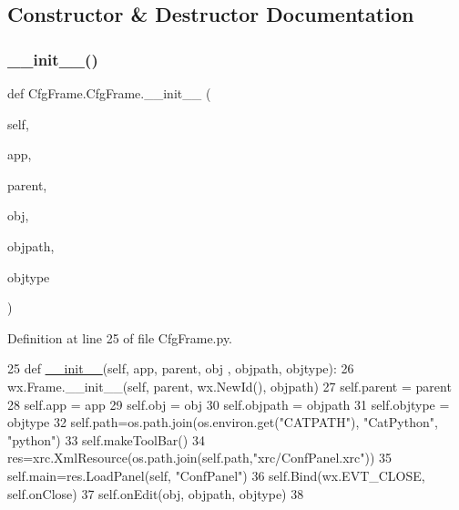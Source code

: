\subsection{Constructor \& Destructor Documentation}
\mbox{\label{classCfgFrame_1_1CfgFrame_aa0881a28d515572385ac1561e63c5c66}} 
\subsubsection{\texorpdfstring{\+\_\+\+\_\+init\+\_\+\+\_\+()}{\_\_init\_\_()}}
{\footnotesize\ttfamily def Cfg\+Frame.\+Cfg\+Frame.\+\_\+\+\_\+init\+\_\+\+\_\+ (\begin{DoxyParamCaption}\item[{}]{self,  }\item[{}]{app,  }\item[{}]{parent,  }\item[{}]{obj,  }\item[{}]{objpath,  }\item[{}]{objtype }\end{DoxyParamCaption})}



Definition at line 25 of file Cfg\+Frame.\+py.


\begin{DoxyCode}
25     \textcolor{keyword}{def }\hyperlink{classwrapper_1_1ModuleDictWrapper_a9a7a794150502f51df687831583e13b9}{\_\_init\_\_}(self, app, parent, obj , objpath, objtype): 
26         wx.Frame.\_\_init\_\_(self, parent, wx.NewId(), objpath)
27         self.parent  = parent
28         self.app     = app
29         self.obj     = obj
30         self.objpath = objpath
31         self.objtype = objtype
32         self.path=os.path.join(os.environ.get(\textcolor{stringliteral}{"CATPATH"}), \textcolor{stringliteral}{"CatPython"}, \textcolor{stringliteral}{"python"})
33         self.makeToolBar()
34         res=xrc.XmlResource(os.path.join(self.path,\textcolor{stringliteral}{"xrc/ConfPanel.xrc"}))
35         self.main=res.LoadPanel(self, \textcolor{stringliteral}{"ConfPanel"})                
36         self.Bind(wx.EVT\_CLOSE, self.onClose)
37         self.onEdit(obj, objpath, objtype)
38         
\end{DoxyCode}


